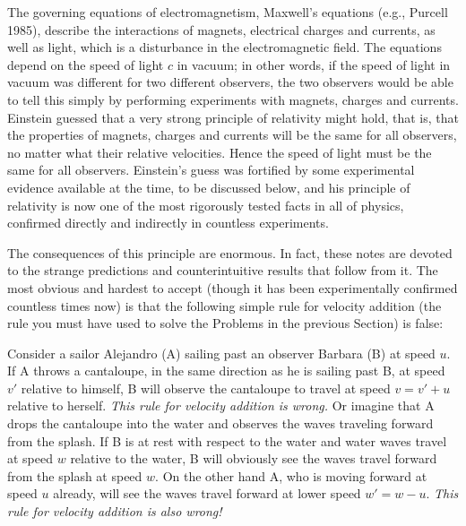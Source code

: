 The governing equations of electromagnetism, Maxwell's equations
(e.g., Purcell 1985), describe the interactions of magnets, electrical
charges and currents, as well as light, which is a disturbance in the
electromagnetic field.  The equations depend on the speed of light $c$
in vacuum; in other words, if the speed of light in vacuum was
different for two different observers, the two observers would be able
to tell this simply by performing experiments with magnets, charges
and currents.  Einstein guessed that a very strong principle of
relativity might hold, that is, that the properties of magnets,
charges and currents will be the same for all observers, no matter
what their relative velocities.  Hence the speed of light must be the
same for all observers.  Einstein's guess was fortified by some
experimental evidence available at the time, to be discussed below,
and his principle of relativity is now one of the most rigorously
tested facts in all of physics, confirmed directly and indirectly in
countless experiments.

The consequences of this principle are enormous.  In fact, these notes
are devoted to the strange predictions and counterintuitive results
that follow from it.  The most obvious and hardest to accept (though
it has been experimentally confirmed countless times now) is that the
following simple rule for velocity addition (the rule you must have
used to solve the Problems in the previous Section) is false:

Consider a sailor Alejandro (A) sailing past an observer Barbara (B)
at speed $u$.  If A throws a cantaloupe, in the same direction as he
is sailing past B, at speed $v'$ relative to himself, B will observe
the cantaloupe to travel at speed $v=v'+u$ relative to herself.  {\em
This rule for velocity addition is wrong.\/} Or imagine that A drops
the cantaloupe into the water and observes the waves traveling forward
from the splash.  If B is at rest with respect to the water and water
waves travel at speed $w$ relative to the water, B will obviously see
the waves travel forward from the splash at speed $w$.  On the other
hand A, who is moving forward at speed $u$ already, will see the waves
travel forward at lower speed $w'=w-u$.  {\em This rule for velocity
addition is also wrong!\/}

